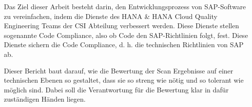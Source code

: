 \documentclass[../main.tex]{subfiles}
\begin{document}
Das Ziel dieser Arbeit besteht darin, den Entwicklungsprozess von SAP-Software zu vereinfachen, indem die Dienste des HANA \& HANA Cloud Quality Engineering Teams der \gls{CSI} Abteilung verbessert werden.
Diese Dienste stellen sogenannte Code Compliance, also ob Code den SAP-Richtlinien folgt, fest.
Diese Dienste sichern die Code Compliance, d. h. die technischen Richtlinien von SAP ab.

Dieser Bericht baut darauf, wie die Bewertung der Scan Ergebnisse auf einer technischen Ebenen so gestaltet, dass sie so streng wie nötig und so tolerant wie möglich sind.
Dabei soll die Verantwortung für die Bewertung klar in dafür zuständigen Händen liegen.
\end{document}
